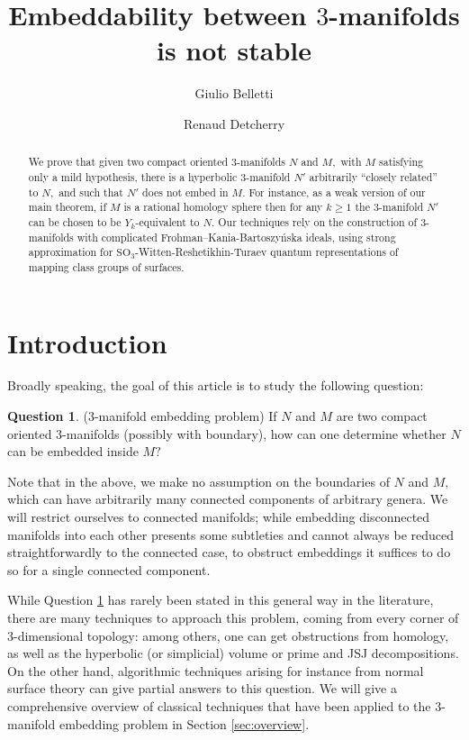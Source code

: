 \documentclass[12pt]{amsart}
\title{Embeddability between $3$-manifolds is not stable}
\author{Giulio Belletti}
\author{Renaud Detcherry}
\date{} %
\theoremstyle{definition}
\newtheorem{ques}{Question}
\begin{document}
	
	\maketitle
	
	\begin{abstract} We prove that given two compact oriented $3$-manifolds $N$ and $M,$ with $M$ satisfying only a mild hypothesis, there is a hyperbolic $3$-manifold $N'$ arbitrarily ``closely related'' to $N,$ and such that $N'$ does not embed in $M.$ For instance, as a weak version of our main theorem, if $M$ is a rational homology sphere then for any $k\geq 1$ the $3$-manifold $N'$ can be chosen to be $Y_k$-equivalent to $N.$  Our techniques rely on the construction of $3$-manifolds with complicated Frohman--Kania-Bartoszy\'nska ideals, using strong approximation for $\mathrm{SO}_3$-Witten-Reshetikhin-Turaev quantum representations of mapping class groups of surfaces.
	\end{abstract}
	
\section{Introduction}
Broadly speaking, the goal of this article is to study the following question:
\begin{ques}\label{ques:mainProblem} ($3$-manifold embedding problem)
	If $N$ and $M$ are two compact oriented $3$-manifolds (possibly with boundary), how can one determine whether $N$ can be embedded inside $M?$
\end{ques}

Note that in the above, we make no assumption on the boundaries of $N$ and $M,$ which can have arbitrarily many connected components of arbitrary genera. 
We will restrict ourselves to connected manifolds; while embedding disconnected manifolds into each other presents some subtleties and cannot always be reduced straightforwardly to the connected case, to obstruct embeddings it suffices to do so for a single connected component. 

While Question \ref{ques:mainProblem} has rarely been stated in this general way in the literature, there are many techniques to approach this problem, coming from every corner of $3$-dimensional topology: among others, one can get obstructions from homology, as well as the hyperbolic (or simplicial) volume or prime and JSJ decompositions. On the other hand, algorithmic techniques arising for instance from normal surface theory can give partial answers to this question. We will give a comprehensive overview of classical techniques that have been applied to the $3$-manifold embedding problem in Section \ref{sec:overview}.
\end{document}

